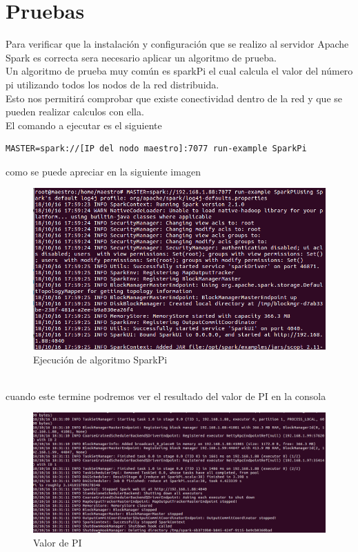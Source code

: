 \section{Pruebas}
Para verificar que la instalación y configuración que se realizo al servidor Apache Spark es correcta sera necesario aplicar un algoritmo de prueba. 
\\
Un algoritmo de prueba muy común es sparkPi el cual calcula el valor del número pi utilizando todos los nodos de la red distribuida. 
\\
Esto nos permitirá comprobar que existe conectividad dentro de la red y que se pueden realizar calculos con ella.
\\
El comando a ejecutar es el siguiente 
\begin{lstlisting} 
MASTER=spark://[IP del nodo maestro]:7077 run-example SparkPi
\end{lstlisting}
como se puede apreciar en la siguiente imagen \\
\begin{figure}[!htbp]
	\hypertarget{fig:red4}{\hspace{1pt}}
	\begin{center}
		\includegraphics[width=.7\textwidth]{capitulo3/images/im9.png}
		\caption{Ejecución de algoritmo SparkPi}
		\label{fig:red4}
	\end{center}
\end{figure}
\\ cuando este termine podremos ver el resultado del valor de PI en la consola \\
\begin{figure}[!htbp]
	\hypertarget{fig:red5}{\hspace{1pt}}
	\begin{center}
		\includegraphics[width=.7\textwidth]{capitulo3/images/im12.png}
		\caption{Valor de PI}
		\label{fig:red5}
	\end{center}
\end{figure}
